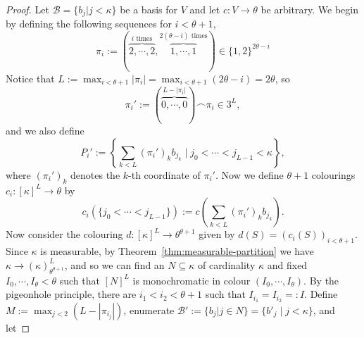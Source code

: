 \documentclass{amsart}
\theoremstyle{definition}
\theoremstyle{remark}
\numberwithin{equation}{section}
\begin{document}
    \begin{proof}
        Let $\mathcal{B}=\{b_{j}|j<\kappa\}$ be a basis for $V$ and let $c:V\longrightarrow\theta$ be arbitrary. We begin by defining the following sequences for $i<\theta+1$,
        \begin{equation*}
            \pi_{i}:=(\overbrace{2,\cdots,2}^{i\text{ times}},\overbrace{1,\cdots,1}^{2(\theta-i)\text{ times}})\in\{1,2\}^{2\theta-i}
        \end{equation*}
        Notice that $L:=\max_{i<\theta+1}|\pi_{i}|=\max_{i<\theta+1}(2\theta-i)=2\theta$, so
        \begin{equation*}
            \pi_{i}':=(\overbrace{0,\cdots,0}^{L-|\pi_{i}|})\frown\pi_{i}\in3^{L},
        \end{equation*}
        and we also define
         \begin{equation*}
             P_{i}':=\left\{\sum_{k<L}(\pi_{i}')_{k}b_{j_{k}}\;\Big|\;j_{0}<\cdots<j_{L-1}<\kappa\right\},
         \end{equation*}
        where $(\pi_{i}')_{k}$ denotes the $k$-th coordinate of $\pi_{i}'$. Now we define $\theta+1$ colourings $ c_{i}:[\kappa]^{L}\longrightarrow\theta$ by
        \begin{equation*}
            c_i(\{j_{0}<\cdots<j_{L-1}\}):=            c\left(\sum_{k<L}(\pi_{i}')_{k} b_{j_{k}}\right).
        \end{equation*}
        Now consider the colouring $d:[\kappa]^{L}\longrightarrow\theta^{\theta+1}$ given by $d(S)=(c_{i}(S))_{i<\theta+1}$. Since $\kappa$ is measurable, by Theorem~\ref{thm:measurable-partition} we have $\kappa\to(\kappa)^{L}_{\theta^{\theta+1}}$, and so we can find an $N\subseteq\kappa$ of cardinality $\kappa$ and fixed $I_{0},\cdots,I_{\theta}<\theta$ such that $[N]^L$ is monochromatic in colour $(I_{0},\cdots,I_{\theta})$. By the pigeonhole principle, there are  $i_{1}<i_{2}<\theta+1$ such that $I_{i_{1}}=I_{i_{2}}=:I$. Define $M:=\max_{j<2}(L-|\pi_{i_{j}}|)$, enumerate $\mathcal{B}':=\{b_j\big|j\in N\}=\{b'_{j}\mid j<\kappa\}$, and let 

\end{proof}
\end{document}
